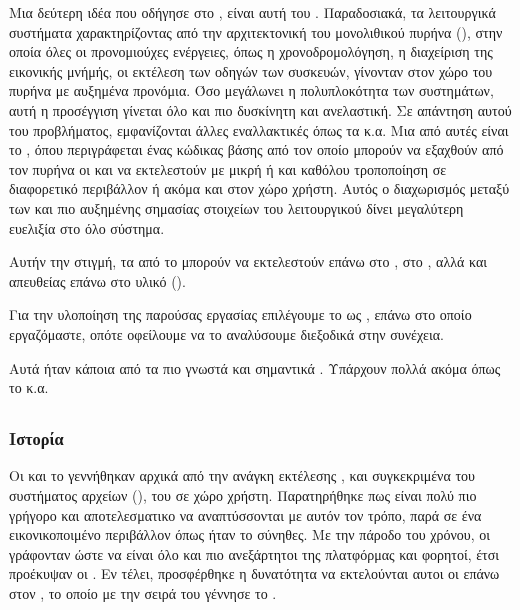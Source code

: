 Μια δεύτερη ιδέα που οδήγησε στο , είναι αυτή του .
Παραδοσιακά, τα λειτουργικά συστήματα χαρακτηρίζοντας από την
αρχιτεκτονική του μονολιθικού πυρήνα (), στην
οποία όλες οι προνομιούχες ενέργειες, όπως η χρονοδρομολόγηση, η
διαχείριση της εικονικής μνήμής, οι εκτέλεση των οδηγών των συσκευών,
γίνονταν στον χώρο του πυρήνα με αυξημένα προνόμια. Όσο μεγάλωνει
η πολυπλοκότητα των συστημάτων, αυτή η προσέγγιση γίνεται όλο και
πιο δυσκίνητη και ανελαστική. Σε απάντηση αυτού του προβλήματος,
εμφανίζονται άλλες εναλλακτικές όπως τα  κ.α. Μια
από αυτές είναι το , όπου περιγράφεται ένας κώδικας βάσης
από τον οποίο μπορούν να εξαχθούν από τον πυρήνα οι  και να
 εκτελεστούν με μικρή ή και καθόλου τροποποίηση σε διαφορετικό
 περιβάλλον ή ακόμα και στον χώρο χρήστη. Αυτός ο διαχωρισμός μεταξύ των
  και πιο αυξημένης σημασίας στοιχείων του λειτουργικού δίνει μεγαλύτερη
 ευελιξία στο όλο σύστημα\cite{noOSnoProb}\cite{interviewKantee}.
\newline

Αυτήν την στιγμή, τα  από το  μπορούν να εκτελεστούν
επάνω στο , στο , αλλά και απευθείας επάνω στο υλικό ().
\newline

Για την υλοποίηση της παρούσας εργασίας επιλέγουμε το  ως
, επάνω στο οποίο εργαζόμαστε, οπότε οφείλουμε να το
αναλύσουμε διεξοδικά στην συνέχεια.
\newline

Αυτά ήταν κάποια από τα πιο γνωστά και σημαντικά .
Υπάρχουν πολλά ακόμα όπως το  κ.α\cite{wikiUnikernel}.




\subsection{}

\subsubsection{Ιστορία}

Οι  και το  γεννήθηκαν αρχικά από την ανάγκη
εκτέλεσης , και συγκεκριμένα του συστήματος αρχείων (),
του  σε χώρο χρήστη. Παρατηρήθηκε πως είναι πολύ πιο γρήγορο
και αποτελεσματικο να αναπτύσσονται  με αυτόν τον τρόπο,
παρά σε ένα εικονικοποιμένο περιβάλλον όπως ήταν το σύνηθες. Με την
πάροδο του χρόνου, οι  γράφονταν ώστε να είναι όλο και
πιο ανεξάρτητοι της πλατφόρμας και φορητοί, έτσι προέκυψαν οι
. Εν τέλει, προσφέρθηκε η δυνατότητα να εκτελούνται αυτοι
οι  επάνω στον , το οποίο με την σειρά του
γέννησε το \cite{RumprunXen}\cite{interviewKantee}.
\newline

